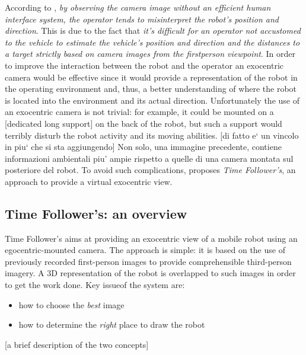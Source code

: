 %
According to \cite{sugimoto}, \textit{by observing the camera image 
without an efficient human interface system, the operator 
tends to misinterpret the robot's position and direction}. This is 
due to the fact that  \textit{it's difficult for an
operator not accustomed to the vehicle to estimate the
vehicle's position and direction and the distances to a
target strictly based on camera images from the firstperson 
viewpoint}.
%
In order to improve the interaction between the robot and the operator 
an exocentric camera would be effective since it would provide a 
representation of the robot in the operating environment and, thus, 
a better understanding of where the robot is located into the environment 
and its actual direction.
%
Unfortunately the use of an exocentric camera is not trivial: for example, 
it could be mounted on a [dedicated long support] on the back of the robot, 
but such a support would terribly disturb the robot activity and its 
moving abilities. [di fatto e` un vincolo in piu` che si sta aggiungendo]
%
Non solo, una immagine precedente, contiene informazioni ambientali piu' 
ampie rispetto a quelle di una camera montata sul posteriore del robot.
%
To avoid such complications, \cite{sugimoto} proposes 
\textit{Time Follower's}, an approach to provide a virtual exocentric 
view.
%
%
\subsection{Time Follower's: an overview}
Time Follower's aims at providing an exocentric view of a mobile 
robot using an egocentric-mounted camera. The approach is simple: it is 
based on the use of previously recorded first-person images to provide 
comprehensible third-person imagery. A 3D representation of the robot 
is overlapped to such images in order to get the work done.
%
Key issueof the system are:
\begin{itemize}
\item how to choose the \textit{best} image
\item how to determine the \textit{right} place to draw the robot
\end{itemize}
%
    [a brief description of the two concepts]
%

